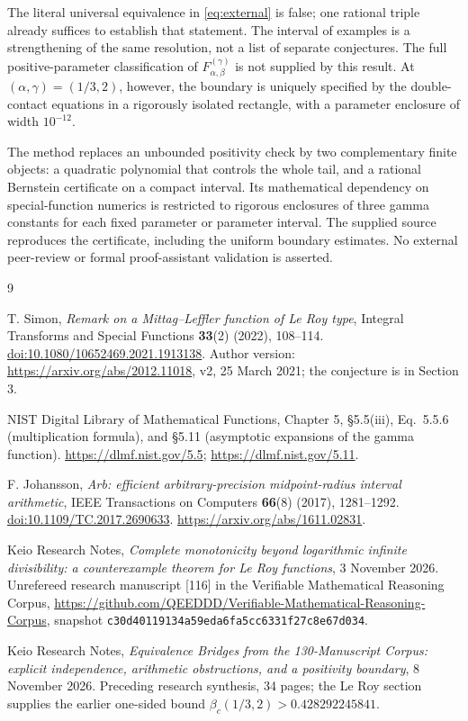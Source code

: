\documentclass[11pt,a4paper]{article}
\numberwithin{equation}{section}
\theoremstyle{definition}\newtheorem{definition}[theorem]{Definition}
\theoremstyle{remark}\newtheorem{remark}[theorem]{Remark}
\begin{document}
The literal universal equivalence in \eqref{eq:external} is false;
one rational triple already suffices to establish that statement.
The interval of examples is a strengthening of the same resolution,
not a list of separate conjectures. The full positive-parameter
classification of \(F_{\alpha,\beta}^{(\gamma)}\) is not supplied by
this result. At \((\alpha,\gamma)=(1/3,2)\), however, the boundary
is uniquely specified by the double-contact equations in a rigorously
isolated rectangle, with a parameter enclosure of width \(10^{-12}\).

The method replaces an unbounded positivity check by two complementary
finite objects: a quadratic polynomial that controls the whole tail,
and a rational Bernstein certificate on a compact interval. Its
mathematical dependency on special-function numerics is restricted
to rigorous enclosures of three gamma constants for each fixed
parameter or parameter interval. The supplied source reproduces the
certificate, including the uniform boundary estimates. No external
peer-review or formal proof-assistant validation is asserted.


\begin{thebibliography}{9}\raggedright

T. Simon, \emph{Remark on a Mittag--Leffler function of Le Roy type},
Integral Transforms and Special Functions \textbf{33}(2) (2022),
108--114. \href{https://doi.org/10.1080/10652469.2021.1913138}
{doi:10.1080/10652469.2021.1913138}.
Author version: \url{https://arxiv.org/abs/2012.11018}, v2,
25 March 2021; the conjecture is in Section 3.

NIST Digital Library of Mathematical Functions, Chapter 5,
\S5.5(iii), Eq.~5.5.6 (multiplication formula), and \S5.11
(asymptotic expansions of the gamma function).
\url{https://dlmf.nist.gov/5.5}; \url{https://dlmf.nist.gov/5.11}.

F. Johansson, \emph{Arb: efficient arbitrary-precision midpoint-radius
interval arithmetic}, IEEE Transactions on Computers \textbf{66}(8)
(2017), 1281--1292.
\href{https://doi.org/10.1109/TC.2017.2690633}
{doi:10.1109/TC.2017.2690633}.
\url{https://arxiv.org/abs/1611.02831}.

Keio Research Notes, \emph{Complete monotonicity beyond logarithmic
infinite divisibility: a counterexample theorem for Le Roy functions},
3 November 2026. Unrefereed research manuscript [116] in the
Verifiable Mathematical Reasoning Corpus,
\url{https://github.com/QEEDDD/Verifiable-Mathematical-Reasoning-Corpus},
snapshot \texttt{c30d40119134a59eda6fa5cc6331f27c8e67d034}.

Keio Research Notes, \emph{Equivalence Bridges from the 130-Manuscript
Corpus: explicit independence, arithmetic obstructions, and a
positivity boundary}, 8 November 2026. Preceding research synthesis,
34 pages; the Le Roy section supplies the earlier one-sided bound
\(\beta_c(1/3,2)>0.428292245841\).

\end{thebibliography}
\end{document}
